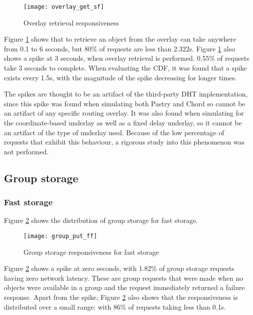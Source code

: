 \begin{figure}[htbp]
 \centering
 \texttt{[image: overlay\_get\_sf]}
 \caption{Overlay retrieval responsiveness}
 \label{fig_overlay_get_sf}
\end{figure}
%
Figure \ref{fig_overlay_get_sf} shows that to retrieve an object from the overlay can take anywhere from 0.1 to 6 seconds, but 80\% of requests are less than 2.322s. Figure \ref{fig_overlay_get_sf} also shows a spike at 3 seconds, when overlay retrieval is performed. 0.55\% of requests take 3 seconds to complete. When evaluating the CDF, it was found that a spike exists every 1.5s, with the magnitude of the spike decreasing for longer times.

The spikes are thought to be an artifact of the third-party DHT implementation, since this spike was found when simulating both Pastry and Chord so cannot be an artifact of any specific routing overlay. It was also found when simulating for the coordinate-based underlay as well as a fixed delay underlay, so it cannot be an artifact of the type of underlay used. Because of the low percentage of requests that exhibit this behaviour, a rigorous study into this phenomenon was not performed.

\subsection{Group storage}
\label{group_storage_eval}

\subsubsection{Fast storage}
\label{group_put_f_fp}

Figure \ref{fig_group_put_ff} shows the distribution of group storage for fast storage.

\begin{figure}[htbp]
 \centering
 \texttt{[image: group\_put\_ff]}
 \caption{Group storage responsiveness for fast storage}
 \label{fig_group_put_ff}
\end{figure}
%
Figure \ref{fig_group_put_ff} shows a spike at zero seconds, with 1.82\% of group storage requests having zero network latency. These are group requests that were made when no objects were available in a group and the request immediately returned a failure response. Apart from the spike, Figure \ref{fig_group_put_ff} also shows that the responsiveness is distributed over a small range: with 86\% of requests taking less than 0.1s.

